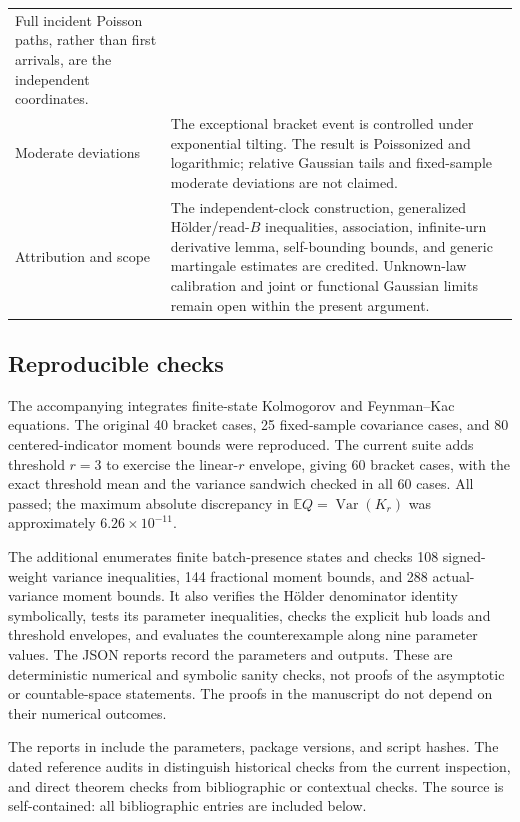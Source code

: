 \documentclass[11pt]{article}
\numberwithin{equation}{section}
\theoremstyle{definition}
\theoremstyle{remark}
\newcommand{\E}{\mathbb E}
\newcommand{\Var}{\operatorname{Var}}
\begin{document}
\begin{longtable}{@{}>{\raggedright\arraybackslash}p{}>{\raggedright\arraybackslash}p{}@{}}
Full incident Poisson paths, rather than first arrivals, are the independent
coordinates.\\
Moderate deviations & The exceptional bracket event is controlled under
exponential tilting. The result is Poissonized and logarithmic; relative
Gaussian tails and fixed-sample moderate deviations are not claimed.\\
Attribution and scope & The independent-clock construction, generalized
H\"older/read-$B$ inequalities, association, infinite-urn derivative lemma,
self-bounding bounds, and generic martingale estimates are credited.
Unknown-law calibration and joint or functional Gaussian limits remain open
within the present argument.\\
\end{longtable}

\subsection*{Reproducible checks}
The accompanying  integrates finite-state
Kolmogorov and Feynman--Kac equations. The original 40 bracket cases, 25 fixed-sample
covariance cases, and 80 centered-indicator moment bounds were reproduced.
The current suite adds threshold $r=3$ to exercise the linear-$r$ envelope,
giving 60 bracket cases, with the exact threshold mean and the variance sandwich
checked in all 60 cases. All passed; the maximum absolute discrepancy in
$\E Q=\Var(K_r)$ was approximately $6.26\times10^{-11}$.

The additional  enumerates finite batch-presence
states and checks 108 signed-weight variance inequalities, 144 fractional
moment bounds, and 288 actual-variance moment bounds. It also verifies the
H\"older denominator identity symbolically, tests its parameter inequalities,
checks the explicit hub loads and threshold envelopes, and evaluates the
counterexample along nine parameter values. The JSON reports record the
parameters and outputs. These are deterministic numerical and symbolic sanity
checks, not proofs of the asymptotic or countable-space statements. The proofs
in the manuscript do not depend on their numerical outcomes.

The reports in  include the parameters, package versions, and
script hashes. The dated reference audits in  distinguish historical
checks from the current inspection, and direct theorem checks from bibliographic
or contextual checks. The source is self-contained: all bibliographic entries
are included below.
\end{document}
